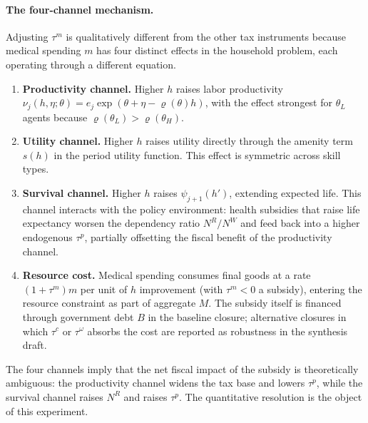 \documentclass[12pt,a4paper]{article}
\begin{document}
\paragraph{The four-channel mechanism.} Adjusting $\tau^{m}$ is
qualitatively different from the other tax instruments because
medical spending $m$ has four distinct effects in the household
problem, each operating through a different equation.
\begin{enumerate}
\item \textbf{Productivity channel.} Higher $h$ raises labor
productivity $\nu_{j}(h, \eta; \theta) = e_{j} \exp(\theta + \eta -
\varrho(\theta) h)$, with the effect strongest for $\theta_{L}$
agents because $\varrho(\theta_{L}) > \varrho(\theta_{H})$.
\item \textbf{Utility channel.} Higher $h$ raises utility directly
through the amenity term $s(h)$ in the period utility function.
This effect is symmetric across skill types.
\item \textbf{Survival channel.} Higher $h$ raises $\psi_{j+1}(h')$,
extending expected life. This channel interacts with the policy
environment: health subsidies that raise life expectancy worsen the
dependency ratio $N^{R}/N^{W}$ and feed back into a higher
endogenous $\tau^{p}$, partially offsetting the fiscal benefit of
the productivity channel.
\item \textbf{Resource cost.} Medical spending consumes final goods
at a rate $(1 + \tau^{m}) m$ per unit of $h$ improvement (with
$\tau^{m} < 0$ a subsidy), entering the resource constraint as part
of aggregate $M$. The subsidy itself is financed through
government debt $B$ in the baseline closure; alternative closures
in which $\tau^{c}$ or $\tau^{\omega}$ absorbs the cost are
reported as robustness in the synthesis draft.
\end{enumerate}
The four channels imply that the net fiscal impact of the subsidy
is theoretically ambiguous: the productivity channel widens the
tax base and lowers $\tau^{p}$, while the survival channel raises
$N^{R}$ and raises $\tau^{p}$. The quantitative resolution is the
object of this experiment.
\end{document}
